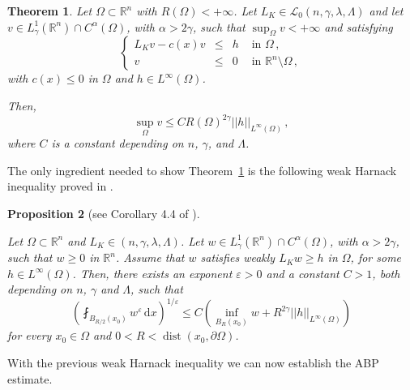 \documentclass[12pt,reqno]{amsart}
\newtheorem{theorem}{Theorem}[section]
\newtheorem{proposition}[theorem]{Proposition}
\theoremstyle{definition}
\theoremstyle{remark}
\newcommand{\con}[1]{\mathbb{#1}}
\newcommand{\R}{\con{R}} %
\newcommand{\lcal}{\mathcal{L}}
\newcommand{\norm}[1]{\left | \left |{#1} \right | \right |}
\newcommand{\s}{\gamma}
\renewcommand{\d}{\,\mathrm{d}} %
\newcommand{\bpar}[1]{\left ( {#1}\right )}
\newcommand\beqc[1]{\left\{\begin{array}{#1}}
\newcommand\eeqc{\end{array} \right.}
\def\PDEsystem{rcll}
\DeclareMathOperator{\dist}{dist}
\numberwithin{equation}{section}
\begin{document}
\begin{theorem}
	\label{Th:ABPEstimate}
	Let $\Omega \subset \R^n$ with $R(\Omega) < +\infty$. Let $L_K \in \lcal_0(n,\s,\lambda, \Lambda)$ and let $v\in L^1_\s(\R^n)\cap C^{\alpha}(\Omega)$, with $\alpha > 2\s$, such that $\sup_{\Omega} v < +\infty$ and satisfying
	$$
	\beqc{\PDEsystem}
	L_K v - c(x)v &\leq & h & \text{ in } \Omega\,, \\
	v & \leq & 0 & \text{ in } \R^n\setminus \Omega\,,
	\eeqc
	$$
	with $c(x)\leq 0$ in $\Omega$ and $h\in L^\infty(\Omega)$.
	
	Then,
	$$
	\sup_\Omega v \leq C R(\Omega)^{2\s} \norm{h}_{L^{\infty}(\Omega)}\,,
	$$
	where $C$ is a constant depending on $n$, $\s$, and $\Lambda$.
\end{theorem}


The only ingredient needed to show Theorem~\ref{Th:ABPEstimate} is the following weak Harnack inequality proved in  \cite{Cozzi-DeGiorgiClassesShort}.

\begin{proposition}[see Corollary 4.4 of \cite{Cozzi-DeGiorgiClassesShort}]
	
	\label{Prop:WeakHarnack}
	
	Let $\Omega \subset \R^n$ and $L_K\in (n,\s,\lambda, \Lambda)$. Let $w \in L^1_\s(\R^n)\cap C^{\alpha}(\Omega)$, with $\alpha > 2\s$, such that $w\geq 0$ in $\R^n$. Assume that $w$ satisfies weakly $L_K w \geq h$ in $\Omega$, for some $h\in L^\infty (\Omega)$. Then, there exists an exponent $\varepsilon > 0 $  and a constant $C > 1$, both depending on $n$, $\s$ and $\Lambda$, such that
	$$
	\bpar{ \fint_{B_{R/2}(x_0)} w^\varepsilon \d x}^{1/\varepsilon} \leq C \bpar{\inf_{B_{R}(x_0)} w + R^{2\s} \norm{h}_{L^{\infty}(\Omega)} }
	$$
	for every $x_0\in \Omega$ and $0<R<\dist(x_0, \partial \Omega)$.
\end{proposition}

With the previous weak Harnack inequality we can now establish the ABP estimate.
\end{document}
